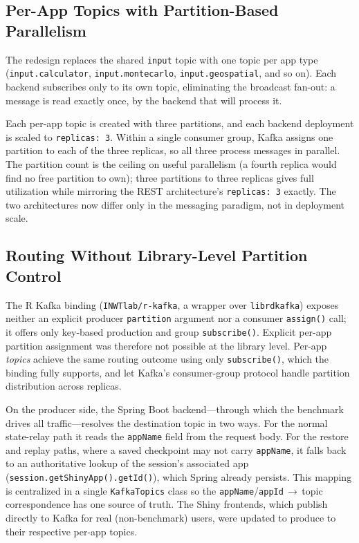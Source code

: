 \documentclass[11pt,a4paper]{article}
\begin{document}
\subsection{Per-App Topics with Partition-Based Parallelism}

The redesign replaces the shared \texttt{input} topic with one topic per
app type (\texttt{input.calculator}, \texttt{input.montecarlo},
\texttt{input.geospatial}, and so on). Each backend subscribes only to
its own topic, eliminating the broadcast fan-out: a message is read
exactly once, by the backend that will process it.

Each per-app topic is created with three partitions, and each backend
deployment is scaled to \texttt{replicas: 3}. Within a single consumer
group, Kafka assigns one partition to each of the three replicas, so all
three process messages in parallel. The partition count is the ceiling
on useful parallelism (a fourth replica would find no free partition to
own); three partitions to three replicas gives full utilization while
mirroring the REST architecture's \texttt{replicas: 3} exactly. The two
architectures now differ only in the messaging paradigm, not in
deployment scale.

\subsection{Routing Without Library-Level Partition Control}

The R Kafka binding (\texttt{INWTlab/r-kafka}, a wrapper over
\texttt{librdkafka}) exposes neither an explicit producer
\texttt{partition} argument nor a consumer \texttt{assign()} call; it
offers only key-based production and group \texttt{subscribe()}. Explicit
per-app partition assignment was therefore not possible at the library
level. Per-app \emph{topics} achieve the same routing outcome using only
\texttt{subscribe()}, which the binding fully supports, and let Kafka's
consumer-group protocol handle partition distribution across replicas.

On the producer side, the Spring Boot backend---through which the
benchmark drives all traffic---resolves the destination topic in two
ways. For the normal state-relay path it reads the \texttt{appName} field
from the request body. For the restore and replay paths, where a saved
checkpoint may not carry \texttt{appName}, it falls back to an
authoritative lookup of the session's associated app
(\texttt{session.getShinyApp().getId()}), which Spring already persists.
This mapping is centralized in a single \texttt{KafkaTopics} class so the
\texttt{appName}/\texttt{appId}\,$\rightarrow$\,topic correspondence has
one source of truth. The Shiny frontends, which publish directly to
Kafka for real (non-benchmark) users, were updated to produce to their
respective per-app topics.
\end{document}
